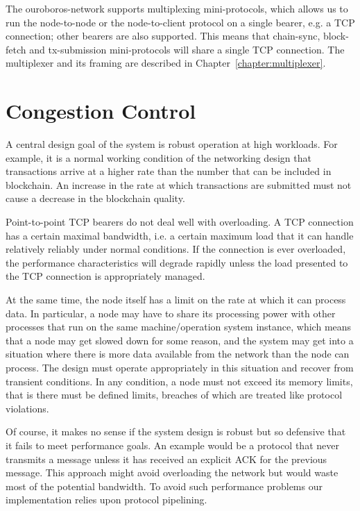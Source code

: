 The ouroboros-network supports multiplexing mini-protocols, which allows us to run
the node-to-node or the node-to-client protocol on a single bearer, e.g. a TCP
connection; other bearers are also supported.  This means that chain-sync,
block-fetch and tx-submission mini-protocols will share a single TCP
connection.  The multiplexer and its framing are described in
Chapter~\ref{chapter:multiplexer}.

\section{Congestion Control}
A central design goal of the system is robust operation at high workloads.  For
example, it is a normal working condition of the networking design that
transactions arrive at a higher rate than the number that can be included in
blockchain.  An increase in the rate at which transactions are submitted must
not cause a decrease in the blockchain quality.

Point-to-point TCP bearers do not deal well with overloading.  A TCP connection
has a certain maximal bandwidth, i.e. a certain maximum load that it can handle
relatively reliably under normal conditions.  If the connection is ever
overloaded, the performance characteristics will degrade rapidly unless the
load presented to the TCP connection is appropriately managed.

At the same time, the node itself has a limit on the rate at which it can
process data.  In particular, a node may have to share its processing power
with other processes that run on the same machine/operation system instance,
which means that a node may get slowed down for some reason, and the system may
get into a situation where there is more data available from the network than the
node can process.  The design must operate appropriately in this situation and
recover from transient conditions.  In any condition, a node must not exceed
its memory limits, that is there must be defined limits, breaches of which
are treated like protocol violations.

Of course, it makes no sense if the system design is robust but so defensive
that it fails to meet performance goals.  An example would be a protocol that
never transmits a message unless it has received an explicit ACK for the
previous message. This approach might avoid overloading the network but would
waste most of the potential bandwidth.  To avoid such performance problems our
implementation relies upon protocol pipelining.



